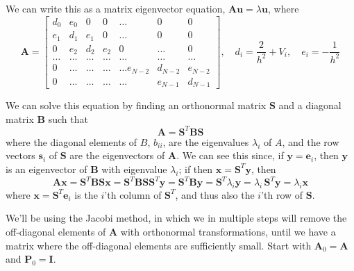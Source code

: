 \documentclass[11pt,a4paper]{article}
\newcommand\V[1]{\mathbf{#1}}                  %
\newcommand\M[1]{\begin{bmatrix} #1 \end{bmatrix}} %
\begin{document}
We can write this as a matrix eigenvector equation, $\V{A} \V{u} = \lambda \V{u}$, where
\begin{equation}
  \V{A} = \M{
    d_0 & e_0 & 0   & 0    & \dots  &0     & 0 \\
    e_1 & d_1 & e_1 & 0    & \dots  &0     &0 \\
    0   & e_2 & d_2 & e_2  &0       &\dots & 0\\
    \dots  & \dots & \dots & \dots  &\dots      &\dots & \dots\\
    0   & \dots & \dots & \dots  &\dots  e_{N-2}     &d_{N-2} & e_{N-2}\\
    0   & \dots & \dots & \dots  &\dots       &e_{N-1} & d_{N-1}
  } , \quad
  d_i = \frac{2}{h^2} + V_i , \quad
  e_i = - \frac{1}{h^2}
\end{equation}

We can solve this equation by finding an orthonormal matrix $\V{S}$ and a diagonal matrix $\V{B}$
such that
\begin{equation}
  \V{A} = \V{S}^T \V{B} \V{S}
\end{equation}
where the diagonal elements of $B$, $b_{ii}$, are the eigenvalues $\lambda_i$ of $A$, and the row
vectors $\V{s}_i$ of $\V{S}$ are the eigenvectors of $\V{A}$. We can see this since, if $\V{y} = \V{e}_i$, then $\V{y}$ is an eigenvector of $\V{B}$ with eigenvalue $\lambda_i$; if then $\V{x} = \V{S}^T \V{y}$, then
\begin{equation}
  \V{A} \V{x}
    = \V{S}^T \V{B} \V{S} \V{x}
    = \V{S}^T \V{B} \V{S} \V{S}^T \V{y}
    = \V{S}^T \V{B} \V{y}
    = \V{S}^T \lambda_i \V{y}
    = \lambda_i \, \V{S}^T \V{y}
    = \lambda_i \V{x}
\end{equation}
where $\V{x} = \V{S}^T \V{e}_i$ is the $i$'th column of $\V{S}^T$, and thus also the $i$'th row of $\V{S}$.

We'll be using the Jacobi method, in which we in multiple steps will remove the off-diagonal elements
of $\V{A}$ with orthonormal transformations, until we have a matrix where the off-diagonal elements are
sufficiently small. Start with $\V{A}_0 = \V{A}$ and $\V{P}_0 = \V{I}$.
\end{document}
